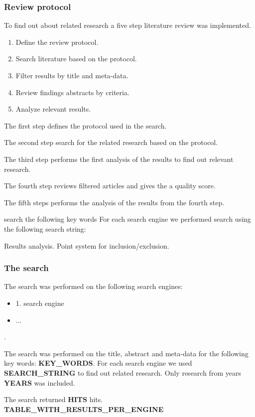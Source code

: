 \subsubsection{Review protocol}
To find out about related research a five step literature review was implemented.

\begin{enumerate}
    \item Define the review protocol.
    \item Search literature based on the protocol.
    \item Filter results by title and meta-data.
    \item Review findings abstracts by criteria.
    \item Analyze relevant results.
\end{enumerate}

The first step defines the protocol used in the search.

The second step search for the related research based on the protocol.

The third step performs the first analysis of the results to find out relevant research.

The fourth step reviews filtered articles and gives the a quality score.

The fifth steps performs the analysis of the results from the fourth step.



 search the following key words
For each search engine we performed search using the following search string: 

Results analysis.
Point system for inclusion/exclusion.


\subsubsection{The search}
The search was performed on the following search engines: 
\begin{itemize}
    \item 1. search engine
    \item ...
\end{itemize}.

The search was performed on the title, abstract and meta-data for the following key words: \textbf{KEY\_WORDS}.
For each search engine we used \textbf{SEARCH\_STRING} to find out related research.
Only research from years \textbf{YEARS} was included.

The search returned \textbf{HITS} hits.
\textbf{TABLE\_WITH\_RESULTS\_PER\_ENGINE}


